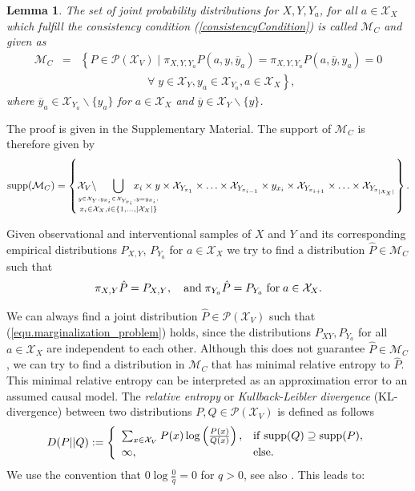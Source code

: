 \documentclass[letterpaper]{article}
\newcommand{\kM}{\mathcal{M}}   %
\newcommand{\kP}{\mathcal{P}}   %
\newcommand{\kX}{\mathcal{X}}   %
\newtheorem{Lemma}{Lemma}
\newcommand{\supp}{{\rm supp}}
\begin{document}
\begin{Lemma} \label{lemma.characterization}
The set of joint probability distributions for $X, Y, Y_{a}$, for all $a \in \kX_X$ which fulfill the consistency condition (\ref{consistencyCondition}) is called $\kM_C$ and given as
\begin{eqnarray*}
\kM_C & = & \left \{P \in \kP(\kX_V) \mid \pi_{X, Y, Y_{a}} P(a, y, \overline{y}_{a}) = \pi_{X, Y, Y_{a}} P(a, \overline{y}, y_{a}) = 0 \right. \\
& & \qquad \qquad \qquad \left. \forall \; y \in \kX_Y, y_{a} \in \kX_{Y_{a}}, a \in \kX_X \right \},
\end{eqnarray*}
where $\overline{y}_{a} \in \kX_{Y_{a}} \backslash \{y_{a}\}$ for $a \in \kX_X$ and $\overline{y} \in \kX_Y \backslash \{y\}$.
\end{Lemma}
The proof is given in the Supplementary Material. The support of $\kM_C$ is therefore given by 
\begin{eqnarray*}
\supp(\kM_C) = \left \{\kX_V \backslash \! \! \! \! \! \! \!\!\!\!\!\!\bigcup_{\stackrel{y\in\kX_Y, y_{x_i}\in \kX_{Y_{x_i}},y=y_{x_i},}{x_i \in \kX_X, i\in \{1,\ldots, |\kX_X|\}}} \! \! \! \! \! \! \! \! \! \! \!\!\!\!\!\!x_i \times y \times \kX_{Y_{x_1}} \times \ldots \times \kX_{Y_{x_{i-1}}} \times y_{x_i} \times \kX_{Y_{x_{i+1}}} \times \ldots \times \kX_{Y_{x_{|\kX_X|}}} \right \}.
\end{eqnarray*}

Given observational and interventional samples of $X$ and $Y$ and its corresponding empirical distributions $P_{X,Y}$, $P_{Y_{a}}$ for $a \in \kX_X$ we try to find a distribution $\hat P \in \kM_C$ such that
\begin{equation} \label{equ.marginalization_problem}
\pi_{X,Y} \hat P = P_{X,Y}, \quad {\rm and}\; \pi_{Y_{a}} \hat P = P_{Y_{a}} \; {\rm for} \; a \in \kX_X.
\end{equation}

We can always find a joint distribution $\hat P \in \kP(\kX_V)$ such that (\ref{equ.marginalization_problem}) holds, since  the distributions $P_{XY}, P_{Y_{a}}$ for all $a \in \kX_X$ are independent to each other. Although this does not guarantee $\hat P \in \kM_C$, we can try to find a distribution in $\kM_C$ that has minimal relative entropy to $\hat P$. This minimal relative entropy can be interpreted as an approximation error to an assumed causal model. The {\em relative entropy} or {\em Kullback-Leibler divergence} (KL-divergence) between two distributions $P, Q \in \kP(\kX_V)$ is defined as follows
$$
D(P || Q) := \left \{ \begin{array}{ll}
\sum_{x \in \kX_V} P(x) \log \left (\frac{P(x)}{Q(x)}\right ), & {\rm if\;} \supp(Q) \supseteq \supp(P), \\
\infty, & {\rm else.}
\end{array}
\right.
$$
We use the convention that $0 \log \frac{0}{q} = 0$ for $q > 0$, see also \cite{CT91, Kak99}. This leads to:
\end{document}

